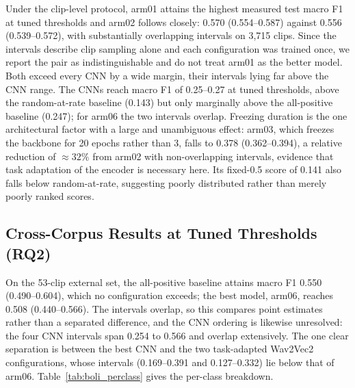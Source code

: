 \documentclass[a4paper,orivec]{llncs}
\begin{document}
Under the clip-level protocol, arm01 attains the highest measured test macro F1
at tuned thresholds and arm02 follows closely: 0.570 (0.554--0.587) against 0.556
(0.539--0.572), with substantially overlapping intervals on 3{,}715 clips. Since
the intervals describe clip sampling alone and each configuration was trained
once, we report the pair as indistinguishable and do not treat arm01 as the
better model. Both exceed every CNN by a wide margin, their intervals lying far
above the CNN range. The CNNs reach macro F1 of 0.25--0.27 at tuned thresholds,
above the random-at-rate baseline (0.143) but only marginally above the
all-positive baseline (0.247); for arm06 the two intervals overlap. Freezing
duration is the one architectural factor with a large and unambiguous effect:
arm03, which freezes the backbone for 20 epochs rather than 3, falls to 0.378
(0.362--0.394), a relative reduction of ${\approx}32\%$ from arm02 with
non-overlapping intervals, evidence that task adaptation of the encoder is
necessary here. Its fixed-0.5 score of 0.141 also falls below random-at-rate,
suggesting poorly distributed rather than merely poorly ranked scores.

\subsection{Cross-Corpus Results at Tuned Thresholds (RQ2)}
\label{sec:res-boli-tuned}
On the 53-clip external set, the all-positive baseline attains macro F1 0.550
(0.490--0.604), which no configuration exceeds; the best model, arm06, reaches
0.508 (0.440--0.566). The intervals overlap, so this compares point estimates
rather than a separated difference, and the CNN ordering is likewise unresolved:
the four CNN intervals span 0.254 to 0.566 and overlap extensively. The one clear
separation is between the best CNN and the two task-adapted Wav2Vec2
configurations, whose intervals (0.169--0.391 and 0.127--0.332) lie below that of
arm06. Table~\ref{tab:boli_perclass} gives the per-class breakdown.
\end{document}
